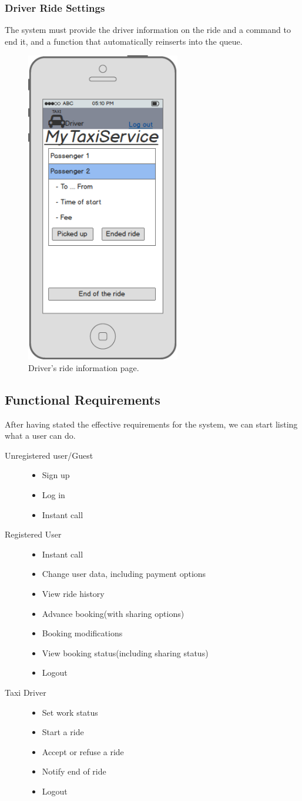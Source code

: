 		\subsubsection {Driver Ride Settings}
			The system must provide the driver information on the ride and a command to end it, and a function that automatically reinserts into the queue.
		 	\begin{figure}[h!]
				\includegraphics[width=0.6\textwidth, width=3cm]{mockup/appdriveron}
				\caption{Driver's ride information page.}
			\end{figure}
			\newpage

\subsection{Functional Requirements}
	After having stated the effective requirements for the system, we can start listing what a user can do.
		\begin{description}
		\item[Unregistered user/Guest] \hfill
			\begin{itemize}
				\item Sign up
				\item Log in
				\item Instant call
			\end{itemize}
		\item[Registered User] \hfill
			\begin{itemize}
				\item Instant call
				\item Change user data, including payment options
				\item View ride history
				\item Advance booking(with sharing options)
				\item Booking modifications
				\item View booking status(including sharing status)
				\item Logout
			\end{itemize}
		\item[Taxi Driver] \hfill
			\begin{itemize}
				\item Set work status
				\item Start a ride
				\item Accept or refuse a ride
				\item Notify end of ride
				\item Logout
			\end{itemize}
		\end{description}
\newpage
